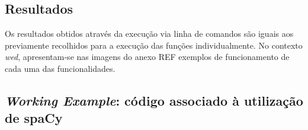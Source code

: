 \documentclass[12pt]{article}
\begin{document}
\subsection{Resultados}

Os resultados obtidos através da execução via linha de comandos são iguais aos previamente recolhidos para a execução das funções individualmente. No contexto \textit{wed}, apresentam-se nas imagens do anexo {{REF}} exemplos de funcionamento de cada uma das funcionalidades.



\setcounter{section}{0}
\setcounter{subsection}{0}


\newpage

\appendixpage
\renewcommand{\thesubsection}{\Alph{subsection}}

\subsection{\textit{Working Example}: código associado à utilização de spaCy}
\label{anexo:working_example_1}
\end{document}
